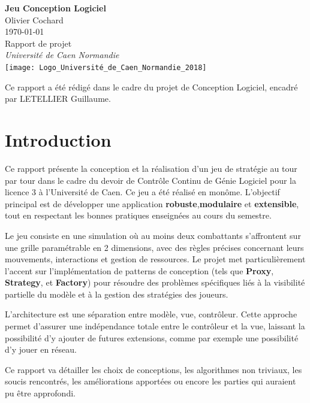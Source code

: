 \documentclass[a4paper,12pt]{article}
\begin{document}
	\begin{titlepage}
		\centering
		{\Huge \textbf{Jeu Conception Logiciel}} \\[1.5cm]
		Olivier Cochard \\
		\today \\[2cm]
		
		
		
		
		{\Large Rapport de projet} \\[0.5cm]
		{\large \textit{Université de Caen Normandie}} \\[2cm]
		\texttt{[image: Logo\_Université\_de\_Caen\_Normandie\_2018]}
		
		
		
		\vfill
		{\small Ce rapport a été rédigé dans le cadre du projet de Conception Logiciel, encadré par LETELLIER Guillaume.}
	\end{titlepage}
	
	\newpage
	\tableofcontents
	
	\section{Introduction}
	Ce rapport présente la conception et la réalisation d’un jeu de stratégie au tour par tour dans le cadre du devoir de Contrôle Continu de Génie Logiciel pour la licence 3 à l’Université de Caen. Ce jeu a été réalisé en monôme. L’objectif principal est de développer une application \textbf{robuste},\textbf{modulaire} et \textbf{extensible}, tout en respectant les bonnes pratiques enseignées au cours du semestre.
	
	Le jeu consiste en une simulation où au moins deux combattants s’affrontent sur une grille paramétrable en 2 dimensions, avec des règles précises concernant leurs mouvements, interactions et gestion de ressources. Le projet met particulièrement l’accent sur l’implémentation de patterns de conception (tels que \textbf{Proxy}, \textbf{Strategy}, et \textbf{Factory}) pour résoudre des problèmes spécifiques liés à la visibilité partielle du modèle et à la gestion des stratégies des joueurs.
	
	L'architecture est une séparation entre modèle, vue, contrôleur. Cette approche permet d'assurer une indépendance totale entre le contrôleur et la vue, laissant la possibilité d'y ajouter de futures extensions, comme par exemple une possibilité d'y jouer en réseau.
	
	Ce rapport va détailler les choix de conceptions, les algorithmes non triviaux, les soucis rencontrés, les améliorations apportées ou encore les parties qui auraient pu être approfondi.
	\newpage
	
\end{document}
